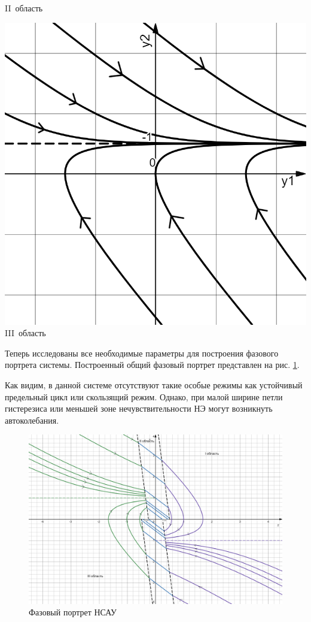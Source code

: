 {\begin{minipage}{.333\textwidth}
		II~область
	\end{minipage}	
	\begin{minipage}{.333\textwidth}
		\centering\includegraphics[width=.95\textwidth]{png/зона3.png}
		III~область
	\end{minipage}

	\label{tr}
}

	Теперь исследованы все необходимые параметры для построения фазового портрета системы. Построенный общий фазовый портрет представлен на рис. \ref{FP}. 
	
	Как видим, в данной системе отсутствуют такие особые режимы как устойчивый предельный цикл или скользящий режим. Однако, при малой ширине петли гистерезиса или меньшей зоне нечувствительности НЭ могут возникнуть автоколебания.	
	
	\begin{figure}[h]
		\centering\includegraphics[width=.8\textwidth]{png/FP.png}
		\caption{Фазовый портрет НСАУ}
		\label{FP}
	\end{figure}
	
